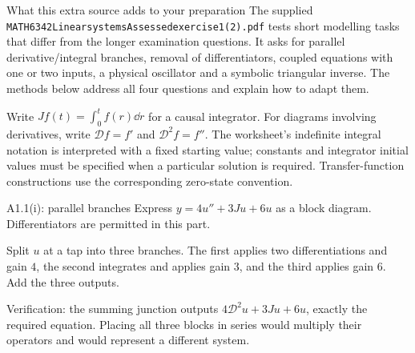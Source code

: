 \begin{concept}{What this extra source adds to your preparation}
The supplied \texttt{MATH6342LinearsystemsAssessedexercise1(2).pdf} tests short modelling tasks that differ from the longer examination questions. It asks for parallel derivative/integral branches, removal of differentiators, coupled equations with one or two inputs, a physical oscillator and a symbolic triangular inverse. The methods below address all four questions and explain how to adapt them.

Write $Jf(t)=\int_0^t f(r)\dd r$ for a causal integrator. For diagrams involving derivatives, write $\mathcal Df=f'$ and $\mathcal D^2f=f''$. The worksheet's indefinite integral notation is interpreted with a fixed starting value; constants and integrator initial values must be specified when a particular solution is required. Transfer-function constructions use the corresponding zero-state convention.
\end{concept}
\begin{question}{A1.1(i): parallel branches}
Express $y=4u''+3Ju+6u$ as a block diagram. Differentiators are permitted in this part.
\end{question}
\begin{answer}
Split $u$ at a tap into three branches. The first applies two differentiations and gain $4$, the second integrates and applies gain $3$, and the third applies gain $6$. Add the three outputs.
\begin{center}
\end{center}
Verification: the summing junction outputs $4\mathcal D^2u+3Ju+6u$, exactly the required equation. Placing all three blocks in series would multiply their operators and would represent a different system.
\end{answer}
